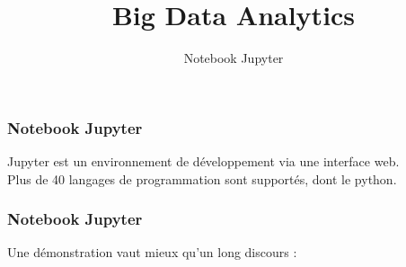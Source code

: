 \documentclass{formation}
\title{Big Data Analytics}
\subtitle{Notebook Jupyter}
\begin{document}
\maketitle

\begin{frame}
  \frametitle{Notebook Jupyter}
  Jupyter est un environnement de développement via une interface web. \\
  Plus de 40 langages de programmation sont supportés, dont le python. \\
\end{frame}

\begin{frame}
  \frametitle{Notebook Jupyter}
  Une démonstration vaut mieux qu'un long discours : \\
\end{frame}
\end{document}
